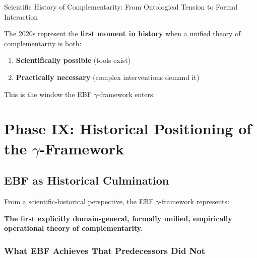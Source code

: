 \begin{chapter}{Scientific History of Complementarity: From Ontological Tension to Formal Interaction}
\begin{tcolorbox}[colback=yellow!5!white,colframe=yellow!75!black,title=\textbf{Historical Conclusion}]
The 2020s represent the \textbf{first moment in history} when a unified theory of complementarity is both:
\begin{enumerate}
    \item \textbf{Scientifically possible} (tools exist)
    \item \textbf{Practically necessary} (complex interventions demand it)
\end{enumerate}

This is the window the EBF $\gamma$-framework enters.
\end{tcolorbox}

\section{Phase IX: Historical Positioning of the $\gamma$-Framework}
\label{sec:phase-ix}

\subsection{EBF as Historical Culmination}

\begin{tcolorbox}[colback=blue!5!white,colframe=blue!75!black,title=\textbf{The $\gamma$-Framework's Historical Position}]
From a scientific-historical perspective, the EBF $\gamma$-framework represents:

\textbf{The first explicitly domain-general, formally unified, empirically operational theory of complementarity.}
\end{tcolorbox}

\subsubsection{What EBF Achieves That Predecessors Did Not}


\end{chapter}
